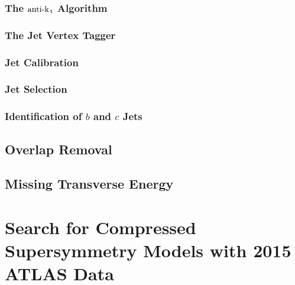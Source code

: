 \documentclass[10pt,twoside,cucitura,classica,openany]{toptesi}
\begin{document}


\subsection{The \emph{$\text{anti-k}_\mathrm{\, t}$} Algorithm}
\label{sec:anti-k_t}



\subsection{The Jet Vertex Tagger }
\label{sec:jet-vertex-tagger}



\subsection{Jet Calibration}
\label{sec:jet-calibration}



\subsection{Jet Selection}
\label{sec:jet-selection}



\subsection{Identification of $b$ and $c$ Jets}
\label{sec:b-jets}



\section{Overlap Removal}
\label{sec:overlap-removal}



\section{Missing Transverse Energy}
\label{sec:miss-transv-energy}



\chapter{Search for Compressed Supersymmetry Models with 2015 ATLAS Data}
\label{cha:monojet-signature}
\end{document}
